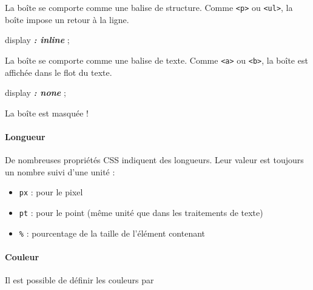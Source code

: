 \documentclass[a4paper,17pt]{extarticle}
\providecommand{\tightlist}{%
      \setlength{\itemsep}{0pt}\setlength{\parskip}{0pt}}
\newenvironment{Shaded}{}{}
\newcommand{\NormalTok}[1]{{#1}}
\newcommand{\InformationTok}[1]{\textcolor[rgb]{0.38,0.63,0.69}{\textbf{\textit{{#1}}}}}
\begin{document}
La boîte se comporte comme une balise de structure. Comme
\texttt{\textless{}p\textgreater{}} ou
\texttt{\textless{}ul\textgreater{}}, la boîte impose un retour à la
ligne.

\begin{Shaded}
\begin{Highlighting}[]
\NormalTok{display }\InformationTok{: inline}\NormalTok{ ;}
\end{Highlighting}
\end{Shaded}

La boîte se comporte comme une balise de texte. Comme
\texttt{\textless{}a\textgreater{}} ou
\texttt{\textless{}b\textgreater{}}, la boîte est affichée dans le flot
du texte.

\begin{Shaded}
\begin{Highlighting}[]
\NormalTok{display }\InformationTok{: none}\NormalTok{ ;\textasciigrave{}}
\end{Highlighting}
\end{Shaded}

La boîte est masquée !

    \hypertarget{longueur}{%
\paragraph{Longueur}\label{longueur}}

    De nombreuses propriétés CSS indiquent des longueurs. Leur valeur est
toujours un nombre suivi d'une unité :

\begin{itemize}
\tightlist
\item
  \texttt{px} : pour le pixel
\item
  \texttt{pt} : pour le point (même unité que dans les traitements de
  texte)
\item
  \texttt{\%} : pourcentage de la taille de l'élément contenant
\end{itemize}

    \hypertarget{couleur}{%
\paragraph{Couleur}\label{couleur}}

    Il est possible de définir les couleurs par
\end{document}
